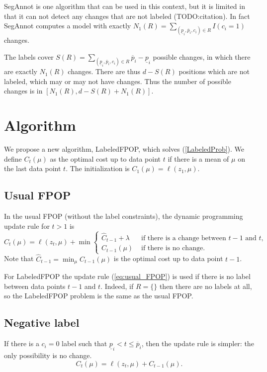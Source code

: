 \documentclass{article}
\begin{document}
SegAnnot is one algorithm that can be used in this context, but it is
limited in that it can not detect any changes that are not labeled
(TODO:citation). In fact SegAnnot computes a model with exactly
$N_1(R)=\sum_{(\underline p_i, \overline p_i, c_i)\in R} I(c_i=1)$ changes.

The labels cover
$S(R)=\sum_{(\underline p_i, \overline p_i, c_i)\in R} \overline
p_i-\underline p_i$ possible changes, in which there are exactly
$N_1(R)$ changes. There are thus $d-S(R)$ positions which are not
labeled, which may or may not have changes. Thus the number of
possible changes is in $[N_1(R), d-S(R)+N_1(R)]$.

\section{Algorithm}

We propose a new algorithm, LabeledFPOP, which solves
(\ref{LabeledProb}). We define $C_t(\mu)$ as the optimal cost up to
data point $t$ if there is a mean of $\mu$ on the last data point
$t$. The initialization is $C_1(\mu)= \ell(z_1, \mu)$. 

\subsection{Usual FPOP}
In the usual
FPOP (without the label constraints), the dynamic programming update
rule for $t>1$ is
\begin{equation}
  \label{eq:usual_FPOP}
  C_t(\mu)=\ell(z_t, \mu) + \min
  \begin{cases}
\hat C_{t-1}+\lambda &\text{ if there is a change between $t-1$ and $t$,}\\
C_{t-1}(\mu) & \text{ if there is no change.}
  \end{cases}
\end{equation}
Note that $\hat C_{t-1}=\min_\mu C_{t-1}(\mu)$ is the optimal cost up
to data point $t-1$.

For LabeledFPOP the update rule (\ref{eq:usual_FPOP}) is used if there
is no label between data points $t-1$ and $t$. Indeed, if $R=\{\}$
then there are no labels at all, so the LabeledFPOP problem is the
same as the usual FPOP.

\subsection{Negative label}
If there is a $c_i=0$ label such that
$\underline p_i < t \leq \overline p_i$, then the update rule is
simpler: the only possibility is no change.
\begin{equation}
  \label{eq:negative_update}
  C_t(\mu)=\ell(z_t,\mu)+
C_{t-1}(\mu).
\end{equation}
\end{document}
